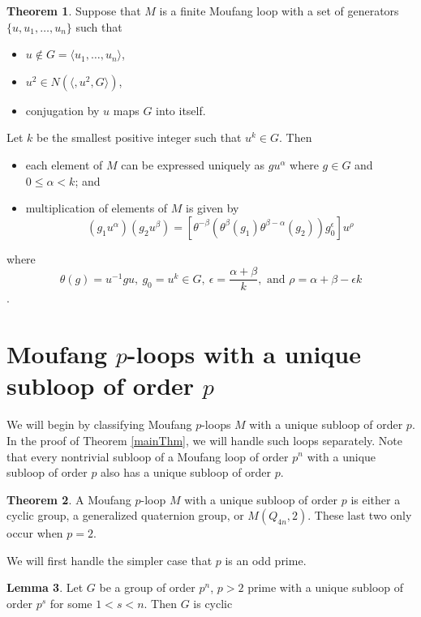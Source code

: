 \documentclass[12pt, twoside, openright]{report}
\theoremstyle{definition}
\newtheorem{thm}{Theorem}[chapter]
\newtheorem{lem}[thm]{Lemma}
\begin{document}
\begin{thm}\label{thm-chein}
  Suppose that $M$ is a finite Moufang loop with a set of generators $\{u, u_1, \ldots, u_n\}$ such that
  \begin{itemize}
    \item $u\notin G = \langle u_1,\ldots, u_n\rangle$,
    \item $u^2\in N(\langle, u^2, G\rangle)$,
    \item conjugation by $u$ maps $G$ into itself.
  \end{itemize}
  Let $k$ be the smallest positive integer such that $u^k\in G$. Then
  \begin{itemize}
    \item each element of $M$ can be expressed uniquely as $gu^\alpha$ where $g\in G$ and $0\leq \alpha < k$; and
    \item multiplication of elements of $M$ is given by
    \[(g_1u^\alpha)(g_2u^\beta) = [\theta^{-\beta}(\theta^\beta(g_1)\theta^{\beta - \alpha}(g_2))g_0^\epsilon]u^\rho\]
  \end{itemize}
  where
  \[\theta(g) = u^{-1}gu,\: g_0 = u^k\in G,\: \epsilon = \frac{\alpha + \beta}{k},\text{ and }
    \rho = \alpha + \beta - \epsilon k\] \cite{Chein}.
\end{thm}


\section{Moufang $p$-loops with a unique subloop of order $p$}

We will begin by classifying Moufang $p$-loops $M$ with a unique subloop of order $p$. In the proof of
  Theorem \ref{mainThm}, we will handle such loops separately. Note that every nontrivial subloop of a
  Moufang loop of order $p^n$ with a unique subloop of order $p$ also has a unique subloop of order $p$.

\begin{thm}\label{moufangDesc}
    A Moufang $p$-loop $M$ with a unique subloop of order $p$ is either a cyclic group, a generalized
      quaternion group, or $M(Q_{4n}, 2)$. These last two only occur when $p = 2$.
\end{thm}

We will first handle the simpler case that $p$ is an odd prime.

\begin{lem}\label{lem-burnside}
  Let $G$ be a group of order $p^n$, $p > 2$ prime with a unique subloop of order $p^s$ for some $1 < s < n$.
    Then $G$ is cyclic \cite{Burnside}
\end{lem}
\end{document}
